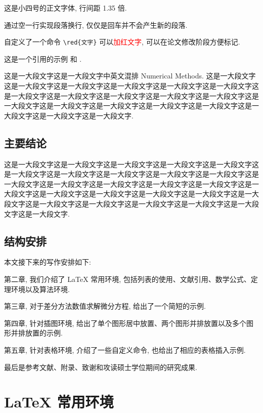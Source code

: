 \documentclass[master,print]{shnuthesis}
\newcommand{\red}[1]{\textcolor{red}{#1}}
\begin{document}
这是小四号的正文字体, 行间距 1.35 倍.

通过空一行实现段落换行, 仅仅是回车并不会产生新的段落.

自定义了一个命令 \verb|\red{文字}| 可以\red{加红文字}, 可以在论文修改阶段方便标记.

这是一个引用的示例 \cite{Tadmor2012} 和 \cite{LiLiu1997,Adams2003,TreWei2014}.

这是一大段文字这是一大段文字中英文混排 Numerical Methods. 这是一大段文字这是一大段文字这是一大段文字这是一大段文字这是一大段文字这是一大段文字这是一大段文字这是一大段文字这是一大段文字这是一大段文字这是一大段文字这是一大段文字这是一大段文字这是一大段文字这是一大段文字这是一大段文字这是一大段文字这是一大段文字这是一大段文字.


\section{主要结论}

这是一大段文字这是一大段文字这是一大段文字这是一大段文字这是一大段文字这是一大段文字这是一大段文字这是一大段文字这是一大段文字这是一大段文字这是一大段文字这是一大段文字这是一大段文字这是一大段文字这是一大段文字这是一大段文字这是一大段文字这是一大段文字这是一大段文字这是一大段文字这是一大段文字这是一大段文字这是一大段文字这是一大段文字这是一大段文字这是一大段文字这是一大段文字.


\section{结构安排}

本文接下来的写作安排如下:

第二章, 我们介绍了 LaTeX 常用环境, 包括列表的使用、文献引用、数学公式、定理环境以及算法环境.

第三章, 对于差分方法数值求解微分方程, 给出了一个简短的示例.

第四章, 针对插图环境, 给出了单个图形居中放置、两个图形并排放置以及多个图形并排放置的示例.

第五章, 针对表格环境, 介绍了一些自定义命令, 也给出了相应的表格插入示例.

最后是参考文献、附录、致谢和攻读硕士学位期间的研究成果.




\chapter{LaTeX 常用环境}
\end{document}

